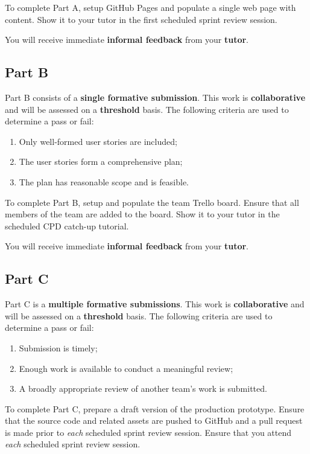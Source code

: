 \documentclass{../fal_assignment}
\begin{document}
To complete Part A, setup GitHub Pages and populate a single web page with content. Show it to your tutor in the first scheduled sprint review session.

You will receive immediate \textbf{informal feedback} from your \textbf{tutor}.

\subsection*{Part B}

Part B consists of a \textbf{single formative submission}. This work is \textbf{collaborative} and will be assessed on a \textbf{threshold} basis. The following criteria are used to determine a pass or fail:

\begin{enumerate}[label=(\alph*)]
	\item Only well-formed user stories are included;
	\item The user stories form a comprehensive plan;
	\item The plan has reasonable scope and is feasible.
\end{enumerate}

To complete Part B, setup and populate the team Trello board. Ensure that all members of the team are added to the board. Show it to your tutor in the scheduled CPD catch-up tutorial.

You will receive immediate \textbf{informal feedback} from your \textbf{tutor}.

\subsection*{Part C}

Part C is a \textbf{multiple formative submissions}. This work is \textbf{collaborative} and will be assessed on a \textbf{threshold} basis. The following criteria are used to determine a pass or fail:

\begin{enumerate}[label=(\alph*)]
	\item Submission is timely;
	\item Enough work is available to conduct a meaningful review;
	\item A broadly appropriate review of another team's work is submitted.
\end{enumerate}

To complete Part C, prepare a draft version of the production prototype. Ensure that the source code and related assets are pushed to GitHub and a pull request is made prior to \textit{each} scheduled sprint review session. Ensure that you attend \textit{each} scheduled sprint review session.
\end{document}
